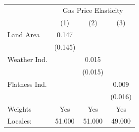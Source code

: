 {
\def\sym#1{\ifmmode^{#1}\else\(^{#1}\)\fi}
\begin{tabular}{l*{3}{c}}
\hline\hline
            &\multicolumn{3}{c}{Gas Price Elasticity}                         \\
            &\multicolumn{1}{c}{(1)}         &\multicolumn{1}{c}{(2)}         &\multicolumn{1}{c}{(3)}         \\
\hline
Land Area   &       0.147         &                     &                     \\
            &     (0.145)         &                     &                     \\
[1em]
Weather Ind.&                     &       0.015         &                     \\
            &                     &     (0.015)         &                     \\
[1em]
Flatness Ind.&                     &                     &       0.009         \\
            &                     &                     &     (0.016)         \\
\hline
Weights     &         Yes         &         Yes         &         Yes         \\
Locales:    &      51.000         &      51.000         &      49.000         \\
\hline\hline
\end{tabular}
}
